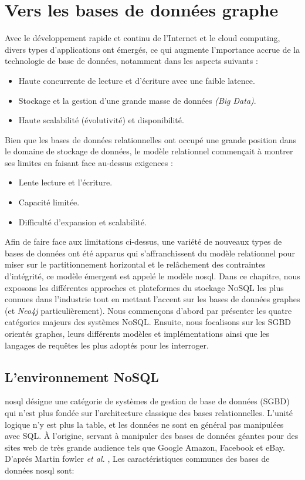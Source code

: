\chapter{Vers les bases de données graphe}
\label{ch:graph-db}
Avec le développement rapide et continu de l'Internet et le cloud
computing, divers types d'applications ont émergés, ce qui augmente
l'mportance accrue de la technologie de base de données, notamment
dans les aspects suivants \cite{han2011survey}:

\begin{itemize}
\item Haute concurrente de lecture et d'écriture avec une faible
  latence.
\item Stockage et la gestion d'une grande masse de données \emph{(Big
    Data)}.
\item Haute scalabilité (évolutivité) et disponibilité.
\end{itemize}

Bien que les bases de données relationnelles ont occupé une grande
position dans le domaine de stockage de données, le modèle relationnel
commençait à montrer ses limites en faisant face au-dessus exigences
\cite{han2011survey}:

\begin{itemize}
\item Lente lecture et l'écriture.
\item Capacité limitée.
\item Difficulté d'expansion et scalabilité.
\end{itemize}

Afin de faire face aux limitations ci-dessus, une variété de nouveaux
types de bases de données ont été apparus qui s'affranchissent du
modèle relationnel pour miser sur le partitionnement horizontal et le
relâchement des contraintes d'intégrité, ce modèle émergent est appelé
le modèle \acrshort{nosql}. Dans ce chapitre, nous exposons les
différentes approches et plateformes du stockage \textsc{NoSQL} les
plus connues dans l'industrie tout en mettant l'accent sur les bases
de données graphes (et \emph{Neo4j} particulièrement). Nous commençons
d'abord par présenter les quatre catégories majeurs des systèmes
\textsc{NoSQL}. Ensuite, nous focalisons sur les \acrshort{SGBD}
orientés graphes, leurs différents modèles et implémentations ainsi
que les langages de requêtes les plus adoptés pour les interroger.

\section{L'environnement NoSQL}
\label{sec:nosql}
\acrshort{nosql} désigne une catégorie de systèmes de gestion de base
de données (\acrshort{SGBD}) qui n'est plus fondée sur l'architecture
classique des bases relationnelles. L'unité logique n'y est plus la
table, et les données ne sont en général pas manipulées avec
\textsc{SQL}. À l'origine, servant à manipuler des bases de données
géantes pour des sites web de très grande audience tels que Google
Amazon, Facebook et eBay. D'aprés Martin fowler \textit{et al.}
\cite{sadalage2012nosql}, Les caractéristiques communes des bases de
données \acrshort{nosql} sont:

